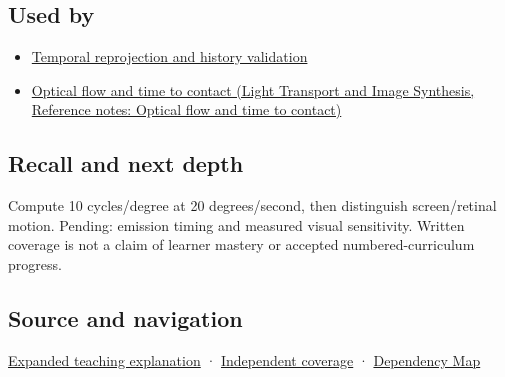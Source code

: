 \subsection{Used by}\label{appendix-70895739febb-used-by}

\hypertarget{appendix-70895739febb-used-by}{}

\begin{itemize}
\tightlist
\item
  \hyperref[appendix-0727340a4428]{Temporal reprojection and history validation}
\item
  \href{../04-Light-Transport-and-Image-Synthesis/main.pdf\#nameddest=appendix-e2e73f8cd93e}{Optical flow and time to contact (Light Transport and Image Synthesis, Reference notes: Optical flow and time to contact)}
\end{itemize}

\subsection{Recall and next depth}\label{appendix-70895739febb-recall-and-next-depth}

\hypertarget{appendix-70895739febb-recall-and-next-depth}{}

Compute 10 cycles/degree at 20 degrees/second, then distinguish screen/retinal motion. Pending: emission timing and measured visual sensitivity. Written coverage is not a claim of learner mastery or accepted numbered-curriculum progress.

\subsection{Source and navigation}\label{appendix-70895739febb-source-and-navigation}

\hypertarget{appendix-70895739febb-source-and-navigation}{}

\hyperref[04-visual-computing-ii-ch042-a-gaze-sample-needs-a-time-as-well-as-a-direction]{Expanded teaching explanation} · \hyperref[appendix-fd090d982a15-xr01---independent-seeing-and-representation-source]{Independent coverage} · \hyperref[appendix-4ad47bdd269a]{Dependency Map}
